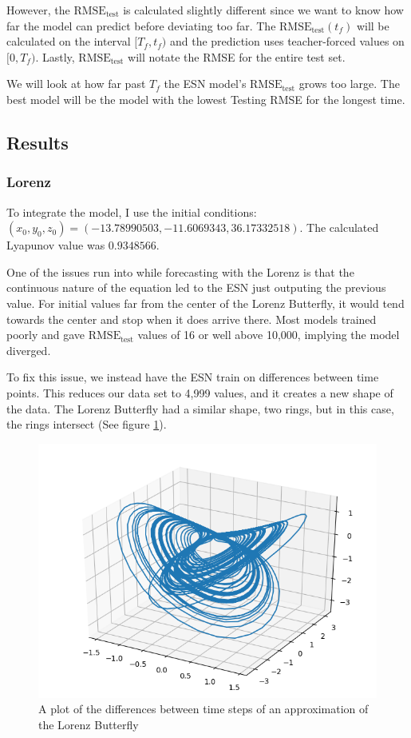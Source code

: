 \documentclass{article}
\begin{document}
However, the $\text{RMSE}_\text{test}$ is calculated slightly different since
we want to know how far the model can predict before deviating too far. The
$\text{RMSE}_\text{test}(t_f)$ will be calculated on the interval $[T_f,
t_f)$ and the prediction uses teacher-forced values on $[0, T_f)$. Lastly,
$\text{RMSE}_\text{test}$ will notate the RMSE for the entire test set.

We will look at how far past $T_f$ the ESN model's $\text{RMSE}_\text{test}$
grows too large. The best model will be the model with the lowest Testing
RMSE for the longest time.

\subsection{Results}
\subsubsection{Lorenz}

To integrate the model, I use the initial conditions: $(x_0, y_0, z_0) =
(-13.78990503, -11.6069343, 36.17332518)$. The calculated Lyapunov value was
$0.9348566$.

One of the issues run into while forecasting with the Lorenz is that the
continuous nature of the equation led to the ESN just outputing the previous
value. For initial values far from the center of the Lorenz Butterfly, it
would tend towards the center and stop when it does arrive there. Most models
trained poorly and gave $\text{RMSE}_\text{test}$ values of 16 or well above
10,000, implying the model diverged.

To fix this issue, we instead have the ESN train on differences between time
points. This reduces our data set to 4,999 values, and it creates a new shape
of the data. The Lorenz Butterfly had a similar shape, two rings, but in this
case, the rings intersect (See figure \ref{fig:lorenz_diff}).

\begin{figure}[H]
    \centering
    \includegraphics[width=.5\linewidth]{doc/paper/images/lorenz/full_differential.png}
    \caption{A plot of the differences between time steps of an approximation of the Lorenz Butterfly}
    \label{fig:lorenz_diff}
\end{figure}
\end{document}
